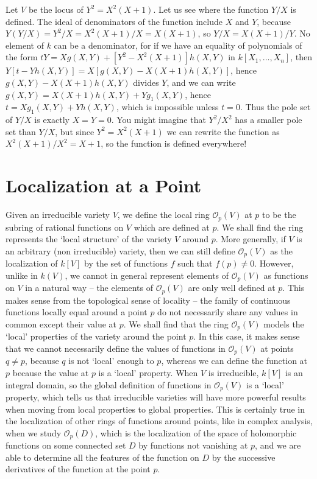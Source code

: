 \begin{example}
    Let $V$ be the locus of $Y^2 = X^2(X+1)$. Let us see where the function $Y/X$ is defined. The ideal of denominators of the function include $X$ and $Y$, because $Y(Y/X) = Y^2/X = X^2(X+1)/X = X(X+1)$, so $Y/X = X(X+1)/Y$. No element of $k$ can be a denominator, for if we have an equality of polynomials of the form $tY = Xg(X,Y) + [Y^2 - X^2(X+1)]h(X,Y)$ in $k[X_1, \dots, X_n]$, then $Y[t - Yh(X,Y)] = X[g(X,Y) - X(X+1)h(X,Y)]$, hence $g(X,Y) - X(X+1)h(X,Y)$ divides $Y$, and we can write $g(X,Y) = X(X+1)h(X,Y) + Yg_1(X,Y)$, hence $t = Xg_1(X,Y) + Yh(X,Y)$, which is impossible unless $t = 0$. Thus the pole set of $Y/X$ is exactly $X = Y = 0$. You might imagine that $Y^2/X^2$ has a smaller pole set than $Y/X$, but since $Y^2 = X^2(X+1)$ we can rewrite the function as $X^2(X+1)/X^2 = X+1$, so the function is defined everywhere!
\end{example}

\section{Localization at a Point}

Given an irreducible variety $V$, we define the local ring $\mathcal{O}_p(V)$ at $p$ to be the subring of rational functions on $V$ which are defined at $p$. We shall find the ring represents the `local structure' of the variety $V$ around $p$. More generally, if $V$ is an arbitrary (non irreducible) variety, then we can still define $\mathcal{O}_p(V)$ as the localization of $k[V]$ by the set of functions $f$ such that $f(p) \neq 0$. However, unlike in $k(V)$, we cannot in general represent elements of $\mathcal{O}_p(V)$ as functions on $V$ in a natural way -- the elements of $\mathcal{O}_p(V)$ are only well defined at $p$. This makes sense from the topological sense of locality -- the family of continuous functions locally equal around a point $p$ do not necessarily share any values in common except their value at $p$. We shall find that the ring $\mathcal{O}_p(V)$ models the `local' properties of the variety around the point $p$. In this case, it makes sense that we cannot necessarily define the values of functions in $\mathcal{O}_p(V)$ at points $q \neq p$, because $q$ is not `local' enough to $p$, whereas we can define the function at $p$ because the value at $p$ is a `local' property. When $V$ is irreducible, $k[V]$ is an integral domain, so the global definition of functions in $\mathcal{O}_p(V)$ is a `local' property, which tells us that irreducible varieties will have more powerful results when moving from local properties to global properties. This is certainly true in the localization of other rings of functions around points, like in complex analysis, when we study $\mathcal{O}_p(D)$, which is the localization of the space of holomorphic functions on some connected set $D$ by functions not vanishing at $p$, and we are able to determine all the features of the function on $D$ by the successive derivatives of the function at the point $p$.

